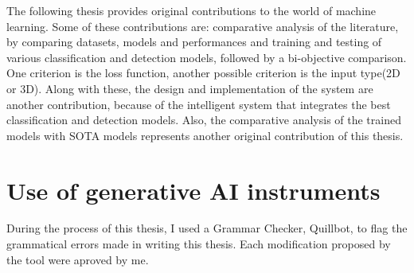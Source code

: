 The following thesis provides original contributions to the world of machine learning. Some of these contributions are: comparative analysis of the literature, by comparing datasets, models and performances and training and testing of various classification and detection models, followed by a bi-objective comparison. One criterion is the loss function, another possible criterion is the input type(2D or 3D). Along with these, the design and implementation of the system are another contribution, because of the intelligent system that integrates the best classification and detection models. Also, the comparative analysis of the trained models with SOTA models represents another original contribution of this thesis.

\section{Use of generative AI instruments}

During the process of this thesis, I used a Grammar Checker, Quillbot, to flag the grammatical errors made in writing this thesis. Each modification proposed by the tool were aproved by me.